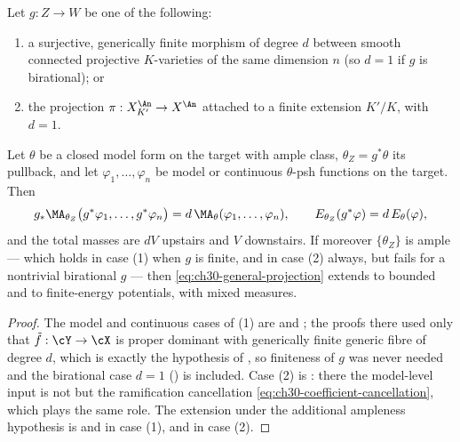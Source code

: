 \begin{theorem}
\label{thm:ch30-general-projection}
Let \(g:Z\to W\) be one of the following:
\begin{enumerate}
\item a surjective, generically finite morphism of degree \(d\) between
smooth connected projective \(K\)-varieties of the same dimension \(n\)
(so \(d=1\) if \(g\) is birational); or
\item the projection \(\pi:X_{K'}^{\An}\to X^{\An}\) attached to a finite
extension \(K'/K\), with \(d=1\).
\end{enumerate}
Let \(\theta\) be a closed model form on the target with ample class,
\(\theta_Z=g^*\theta\) its pullback, and let
\(\varphi_1,\ldots,\varphi_n\) be model or continuous \(\theta\)-psh
functions on the target.  Then
\begin{equation}
\label{eq:ch30-general-projection}
 g_*\MA_{\theta_Z}\bigl(g^*\varphi_1,\ldots,g^*\varphi_n\bigr)
 =d\,\MA_\theta(\varphi_1,\ldots,\varphi_n),
 \qquad
 E_{\theta_Z}(g^*\varphi)=d\,E_\theta(\varphi),
\end{equation}
and the total masses are \(dV\) upstairs and \(V\) downstairs.  If moreover
\(\{\theta_Z\}\) is ample --- which holds in case (1) when \(g\) is finite,
and in case (2) always, but fails for a nontrivial birational \(g\) ---
then \eqref{eq:ch30-general-projection} extends to bounded and to
finite-energy potentials, with mixed measures.
\end{theorem}

\begin{proof}
The model and continuous cases of (1) are
 and
; the proofs there used only that
\(\tilde f:\cY\to\cX\) is proper dominant with generically finite generic
fibre of degree \(d\), which is exactly the hypothesis of
, so finiteness of \(g\) was never
needed and the birational case \(d=1\)
() is included.  Case (2) is
: there the model-level input is not
 but the ramification cancellation
\eqref{eq:ch30-coefficient-cancellation}, which plays the same role.  The
extension under the additional ampleness hypothesis is
 and
 in case (1), and
 in case (2).
\end{proof}

